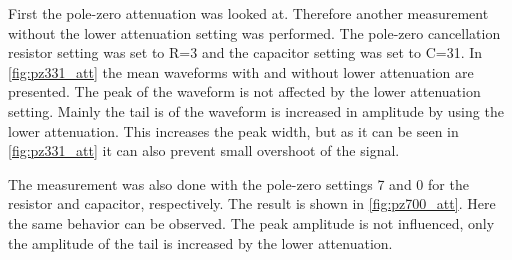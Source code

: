 First the pole-zero attenuation was looked at.
Therefore another measurement without the lower attenuation setting was performed.
The pole-zero cancellation resistor setting was set to R=3 and the capacitor setting was set to C=31. 
In \autoref{fig:pz331_att} the mean waveforms with and without lower attenuation are presented.
The peak of the waveform is not affected by the lower attenuation setting.
Mainly the tail is of the waveform is increased in amplitude by using the lower attenuation.
This increases the peak width, but as it can be seen in \autoref{fig:pz331_att} it can also prevent small overshoot of the signal.

The measurement was also done with the pole-zero settings 7 and 0 for the resistor and capacitor, respectively.
The result is shown in \autoref{fig:pz700_att}.
Here the same behavior can be observed.
The peak amplitude is not influenced, only the amplitude of the tail is increased by the lower attenuation.
